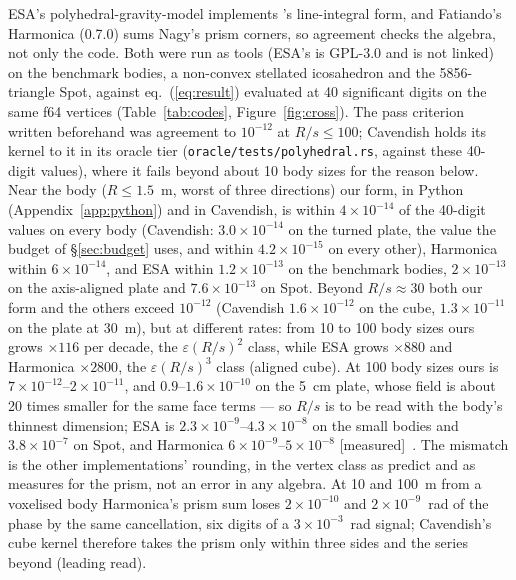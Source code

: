 \documentclass[10pt,a4paper]{article}
\newcommand{\tagM}{\textsf{\small[measured]}}
\begin{document}
ESA's polyhedral-gravity-model
\citep{schuhmacher2024} implements \citet{tsoulis2012}'s line-integral form, and Fatiando's Harmonica
(0.7.0) sums Nagy's prism corners, so agreement checks the algebra, not only the code. Both were run as
tools (ESA's is GPL-3.0 and is not linked) on the benchmark bodies, a non-convex stellated icosahedron
and the 5856-triangle Spot, against eq.~(\ref{eq:result}) evaluated at 40 significant digits on the
same f64 vertices (Table~\ref{tab:codes}, Figure~\ref{fig:cross}). The pass criterion written
beforehand was agreement to $10^{-12}$ at $R/s\le100$; Cavendish holds its kernel to it in its
oracle tier (\texttt{oracle/tests/polyhedral.rs}, against these 40-digit values), where it fails
beyond about 10 body sizes for the reason below. Near the body ($R\le1.5$~m, worst of three
directions) our form, in Python (Appendix~\ref{app:python}) and in Cavendish, is within $4\times10^{-14}$ of the 40-digit values on
every body (Cavendish: $3.0\times10^{-14}$ on the turned plate, the value the budget of
\S\ref{sec:budget} uses, and within $4.2\times10^{-15}$ on every other), Harmonica within $6\times10^{-14}$, and ESA within
$1.2\times10^{-13}$ on the benchmark bodies, $2\times10^{-13}$ on the axis-aligned plate and
$7.6\times10^{-13}$ on Spot.
Beyond $R/s\approx30$ both our form and the others exceed $10^{-12}$ (Cavendish $1.6\times10^{-12}$ on
the cube, $1.3\times10^{-11}$ on the plate at 30~m), but at different rates: from 10 to 100 body sizes
ours grows $\times116$ per decade, the $\varepsilon(R/s)^2$ class, while ESA grows $\times880$ and
Harmonica $\times2800$, the $\varepsilon(R/s)^3$ class (aligned cube). At 100 body sizes ours is
$7\times10^{-12}$--$2\times10^{-11}$, and $0.9$--$1.6\times10^{-10}$ on the 5~cm plate, whose field
is about 20 times smaller for the same face terms --- so $R/s$ is to be read with the body's thinnest
dimension; ESA is $2.3\times10^{-9}$--$4.3\times10^{-8}$ on the small bodies and $3.8\times10^{-7}$
on Spot, and Harmonica $6\times10^{-9}$--$5\times10^{-8}$ \tagM\ \citep[Table~A]{paperbench}. The mismatch is the other implementations' rounding, in the
vertex class as \citet{holstein1996} predict and as \citet[\S3.2]{fukushima2020} measures for the
prism, not an error in any algebra. At 10 and 100~m from a voxelised body Harmonica's prism sum loses
$2\times10^{-10}$ and $2\times10^{-9}$~rad of the phase by the same cancellation, six digits of a
$3\times10^{-3}$~rad signal; Cavendish's cube kernel therefore takes the prism only within three sides
and the series beyond (leading read).
\end{document}
